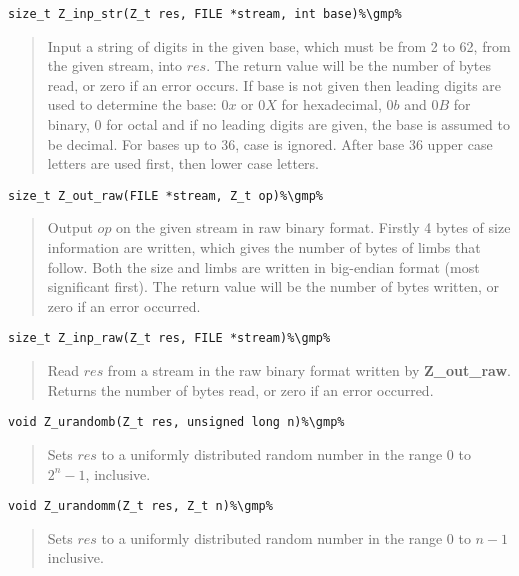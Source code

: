 \documentclass[a4paper,10pt]{article}
\newcommand{\gmp}{\hfill[GMP]}
\begin{document}
\begin{lstlisting}
size_t Z_inp_str(Z_t res, FILE *stream, int base)%\gmp%
\end{lstlisting}
\begin{quote}Input a string of digits in the given base, which must be from 2 to 62, from the given stream, into $res$. The return value will be the number of bytes read, or zero if an error occurs. If base is not given then leading digits are used to determine the base: $0x$ or $0X$ for hexadecimal, $0b$ and $0B$ for binary, $0$ for octal and if no leading digits are given, the base is assumed to be decimal. For bases up to 36, case is ignored. After base 36 upper case letters are used first, then lower case letters.\end{quote}

\begin{lstlisting}
size_t Z_out_raw(FILE *stream, Z_t op)%\gmp%
\end{lstlisting}
\begin{quote}Output $op$ on the given stream in raw binary format. Firstly 4 bytes of size information are written, which gives the number of bytes of limbs that follow. Both the size and limbs are written in big-endian format (most significant first). The return value will be the number of bytes written, or zero if an error occurred.\end{quote}

\begin{lstlisting}
size_t Z_inp_raw(Z_t res, FILE *stream)%\gmp%
\end{lstlisting}
\begin{quote}Read $res$ from a stream in the raw binary format written by \textbf{Z\_out\_raw}. Returns the number of bytes read, or zero if an error occurred.\end{quote}

\begin{lstlisting}
void Z_urandomb(Z_t res, unsigned long n)%\gmp%
\end{lstlisting}
\begin{quote}Sets $res$ to a uniformly distributed random number in the range 0 to $2^n-1$, inclusive.\end{quote}

\begin{lstlisting}
void Z_urandomm(Z_t res, Z_t n)%\gmp%
\end{lstlisting}
\begin{quote}Sets $res$ to a uniformly distributed random number in the range 0 to $n-1$ inclusive.\end{quote}
\end{document}
